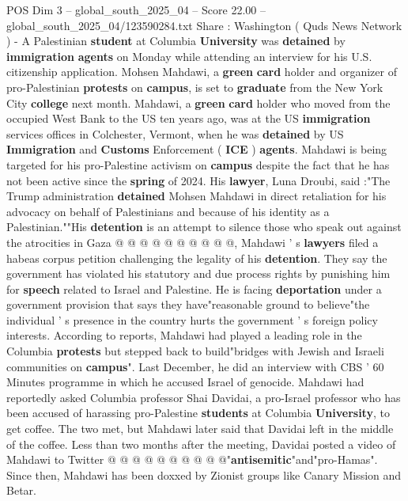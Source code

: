 \begin{textsample}{POS Dim 3 – global\_south\_2025\_04 – Score 22.00 – global\_south\_2025\_04/123590284.txt}  \label{ex:f3_pos_116}
Share : Washington ( Quds News Network ) - A Palestinian \textbf{student} at Columbia \textbf{University} was \textbf{detained} by \textbf{immigration} \textbf{agents} on Monday while attending an interview for his U.S. citizenship application.
Mohsen Mahdawi, a \textbf{green} \textbf{card} holder and organizer of pro-Palestinian \textbf{protests} on \textbf{campus}, is set to \textbf{graduate} from the New York City \textbf{college} next month.
Mahdawi, a \textbf{green} \textbf{card} holder who moved from the occupied West Bank to the US ten years ago, was at the US \textbf{immigration} services offices in Colchester, Vermont, when he was \textbf{detained} by US \textbf{Immigration} and \textbf{Customs} Enforcement ( \textbf{ICE} ) \textbf{agents}.
Mahdawi is being targeted for his pro-Palestine activism on \textbf{campus} despite the fact that he has not been active since the \textbf{spring} of 2024.
His \textbf{lawyer}, Luna Droubi, said :"The Trump administration \textbf{detained} Mohsen Mahdawi in direct retaliation for his advocacy on behalf of Palestinians and because of his identity as a Palestinian.""His \textbf{detention} is an attempt to silence those who speak out against the atrocities in Gaza @ @ @ @ @ @ @ @ @ @, Mahdawi ' s \textbf{lawyers} filed a habeas corpus petition challenging the legality of his \textbf{detention}.
They say the government has violated his statutory and due process rights by punishing him for \textbf{speech} related to Israel and Palestine.
He is facing \textbf{deportation} under a government provision that says they have"reasonable ground to believe"the individual ' s presence in the country hurts the government ' s foreign policy interests.
According to reports, Mahdawi had played a leading role in the Columbia \textbf{protests} but stepped back to build"bridges with Jewish and Israeli communities on \textbf{campus}".
Last December, he did an interview with CBS ' 60 Minutes programme in which he accused Israel of genocide.
Mahdawi had reportedly asked Columbia professor Shai Davidai, a pro-Israel professor who has been accused of harassing pro-Palestine \textbf{students} at Columbia \textbf{University}, to get coffee.
The two met, but Mahdawi later said that Davidai left in the middle of the coffee.
Less than two months after the meeting, Davidai posted a video of Mahdawi to Twitter @ @ @ @ @ @ @ @ @ @"\textbf{antisemitic}"and"pro-Hamas".
Since then, Mahdawi has been doxxed by Zionist groups like Canary Mission and Betar.

\end{textsample}
